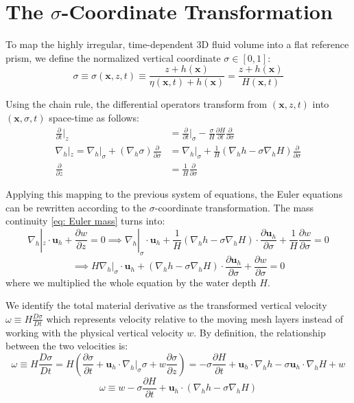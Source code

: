 \documentclass{article}
\newcommand{\uh}{\mathbf{u}_h}
\newcommand{\nablah}{\nabla_h}
\newcommand{\ddt}[1]{\frac{\partial #1}{\partial t}}
\newcommand{\dds}[1]{\frac{\partial #1}{\partial \sigma}}
\begin{document}
\section{The $\sigma$-Coordinate Transformation}

To map the highly irregular, time-dependent 3D fluid volume into a flat reference prism, we define the normalized vertical coordinate $\sigma \in [0, 1]$:
\begin{equation}
    \sigma \equiv \sigma(\mathbf{x},z,t) \equiv \frac{z + h(\mathbf{x})}{\eta(\mathbf{x}, t) + h(\mathbf{x})} = \frac{z + h(\mathbf{x})}{H(\mathbf{x}, t)}    
\end{equation}

Using the chain rule, the differential operators transform from $(\mathbf{x}, z, t)$ into $(\mathbf{x}, \sigma, t)$ space-time as follows:
\begin{align*}
    \frac{\partial}{\partial t}\bigg|_z &= \frac{\partial}{\partial t}\bigg|_{\sigma} - \frac{\sigma}{H}\ddt{H}\frac{\partial}{\partial \sigma} \\[1mm] 
    \nablah|_z = \nablah|_\sigma + (\nablah \sigma)\frac{\partial}{\partial \sigma} &= \nablah|_\sigma + \frac{1}{H}\left(\nablah h - \sigma \nablah H\right)\frac{\partial}{\partial \sigma} \\[1mm]
    \frac{\partial}{\partial z} &= \frac{1}{H}\frac{\partial}{\partial \sigma}
\end{align*}

Applying this mapping to the previous system of equations, the Euler equations can be rewritten according to the $\sigma$-coordinate transformation. 
The mass continuity \eqref{eq: Euler mass} turns into: 
$$\nablah|_z \cdot \uh + \frac{\partial w}{\partial z} = 0 \implies \nablah|_{\sigma} \cdot \uh + \frac{1}{H}\left(\nablah h - \sigma \nablah H\right) \cdot \dds{\uh} + \frac{1}{H}\dds{w} = 0$$
$$\implies H \nablah|_{\sigma} \cdot \uh + \left(\nablah h - \sigma \nablah H\right) \cdot \dds{\uh} + \dds{w} = 0$$
where we multiplied the whole equation by the water depth $H$. 

We identify the total material derivative as the transformed vertical velocity $\omega\equiv H \frac{D\sigma}{Dt}$ which represents velocity relative to the moving mesh layers instead of working with the physical vertical velocity $w$.
By definition, the relationship between the two velocities is:
\begin{equation*}
    \omega \equiv H \frac{D\sigma}{Dt} = H \left( \frac{\partial \sigma}{\partial t} + \uh \cdot \nablah|_\sigma \sigma + w \frac{\partial \sigma}{\partial z} \right)  = -\sigma \ddt{H} + \uh \cdot \nablah h - \sigma \uh \cdot \nablah H + w
\end{equation*}
\begin{equation}
    \boxed{\omega \equiv w -\sigma \ddt{H} + \uh \cdot \left(\nablah h - \sigma \nablah H \right)}
    \label{eq: def omega}
\end{equation}
\end{document}
